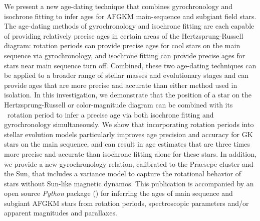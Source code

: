 We present a new age-dating technique that combines gyrochronology and
isochrone fitting to infer ages for AFGKM main-sequence and subgiant field
stars.
The age-dating methods of gyrochronology and isochrone fitting are each
capable of providing relatively precise ages in certain areas of the
Hertzsprung-Russell diagram: rotation periods can provide precise ages for
cool stars on the main sequence via gyrochronology, and isochrone fitting
can provide precise ages for stars near main sequence turn off.
Combined, these two age-dating techniques can be applied to a broader range of
stellar masses and evolutionary stages and can provide ages that are more
precise and accurate than either method used in isolation.
In this investigation, we demonstrate that the position of a star on the
Hertzsprung-Russell or color-magnitude diagram can be combined with its
\kepler\ rotation period to infer a precise age via both isochrone fitting
and gyrochronology simultaneously.
We show that incorporating rotation periods into stellar evolution models
particularly improves age precision and accuracy for GK stars on the main
sequence, and can result in age estimates that are three times more precise
and accurate than isochrone fitting alone for these stars.
In addition, we provide a new gyrochronology relation, calibrated to the
Praesepe cluster and the Sun, that includes a variance model to capture the
rotational behavior of stars without Sun-like magnetic dynamos.
This publication is accompanied by an open source {\it Python} package (\sd)
for inferring the ages of main sequence and subgiant AFGKM stars from rotation
periods, spectroscopic parameters and/or apparent magnitudes and parallaxes.
